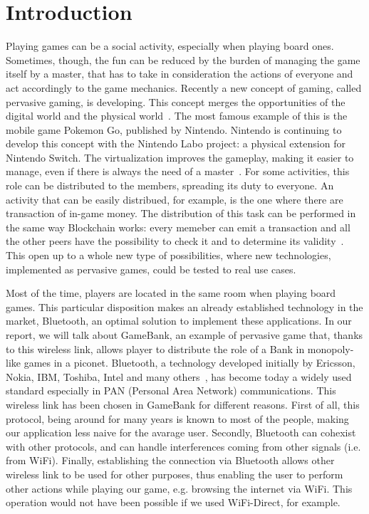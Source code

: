 \section{Introduction}

Playing games can be a social activity, especially when playing board ones. 
Sometimes, though, the fun can be reduced by the burden of managing the 
game itself by a master, that has to take in consideration the actions of 
everyone and act accordingly to the game mechanics. Recently a new concept of 
gaming, called pervasive gaming, is developing. This concept merges the 
opportunities of the digital world and the physical world~\cite{arango17}. The 
most famous example of this is the mobile game Pokemon Go, published by 
Nintendo. Nintendo is continuing to develop this concept with the Nintendo Labo 
project: a physical extension for Nintendo Switch.
The virtualization improves the gameplay, making it easier to manage, even if 
there is always the need of a master~\cite{bjork01}.
For some activities, this role can be distributed to the members, spreading its 
duty to everyone. An activity that can be easily distribued, for example, is the 
one where there are transaction of in-game money. The distribution of this task 
can be performed in the same way Blockchain works: every memeber can emit a 
transaction and all the other peers have the possibility to check it and to 
determine its validity~\cite{nakamoto08}. This open up to a whole new type of 
possibilities, where new technologies, implemented as pervasive games, could be 
tested to real use cases.

Most of the time, players are located in the same room when playing board 
games. This particular disposition makes an already established technology in 
the market, Bluetooth, an optimal solution to implement these applications. In 
our report, we will talk about GameBank, an example of pervasive game that, 
thanks to this wireless link, allows player to distribute the role of a Bank in 
monopoly-like games in a piconet.
Bluetooth, a technology developed initially by Ericsson, Nokia, IBM, Toshiba, 
Intel and many others~\cite{haartsen00}, has become today a widely used
standard especially in PAN (Personal Area Network) communications. This
wireless link has been chosen in GameBank for different reasons. First of all,
this protocol, being around for many years is known to most of the people,
making our application less naive for the avarage user. Secondly, Bluetooth can
cohexist with other protocols, and can handle interferences coming from other
signals (i.e. from WiFi). Finally, establishing the connection via Bluetooth
allows other wireless link to be used for other purposes, thus enabling the
user to perform other actions while playing our game, e.g. browsing the
internet via WiFi. This operation would not have been possible if we used 
WiFi-Direct, for example.\\

